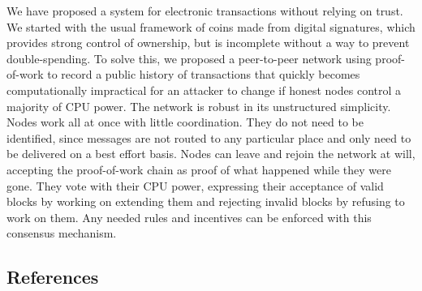 We have proposed a system for electronic transactions without relying on
trust. We started with the usual framework of coins made from digital
signatures, which provides strong control of ownership, but is
incomplete without a way to prevent double-spending. To solve this, we
proposed a peer-to-peer network using proof-of-work to record a public
history of transactions that quickly becomes computationally impractical
for an attacker to change if honest nodes control a majority of CPU
power. The network is robust in its unstructured simplicity. Nodes work
all at once with little coordination. They do not need to be identified,
since messages are not routed to any particular place and only need to
be delivered on a best effort basis. Nodes can leave and rejoin the
network at will, accepting the proof-of-work chain as proof of what
happened while they were gone. They vote with their CPU power,
expressing their acceptance of valid blocks by working on extending them
and rejecting invalid blocks by refusing to work on them. Any needed
rules and incentives can be enforced with this consensus mechanism.

\subsection{References}\label{references}
